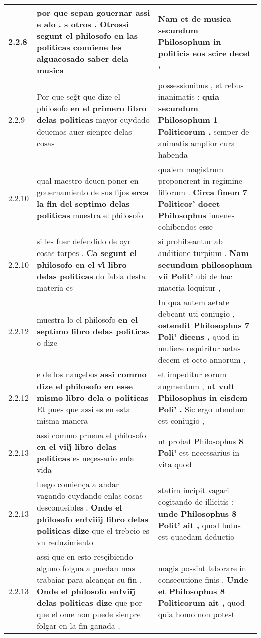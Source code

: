 \begin{tabular}{|p{1cm}|p{6.5cm}|p{6.5cm}|}
2.2.8 & por que sepan gouernar assi e alo . s otros . \textbf{ Otrossi segunt el philosofo en las politicas conuiene les } alguacosado saber dela musica & Nam et de musica \textbf{ secundum Philosophum in politicis } eos scire decet , \\\hline
2.2.9 & Por que seg̃t que dize el philosofo \textbf{ en el primero libro delas politicas } mayor cuydado deuemos auer sienpre delas cosas & possessionibus , et rebus inanimatis : \textbf{ quia secundum Philosophum 1 Politicorum , } semper de animatis amplior cura habenda \\\hline
2.2.10 & qual maestro deuen poner en gouernamiento de sus fijos \textbf{ erca la fin del septimo delas politicas } muestra el philosofo & qualem magistrum proponerent in regimine filiorum . \textbf{ Circa finem 7 Politicor’ docet Philosophus } iuuenes cohibendos esse \\\hline
2.2.10 & si les fuer defendido de oyr cosas torpes . \textbf{ Ca segunt el philosofo en el vi̊ libro delas politicas } do fabla desta materia es & si prohibeantur ab auditione turpium . \textbf{ Nam secundum philosophum vii Polit’ } ubi de hac materia loquitur , \\\hline
2.2.12 & muestra lo el philosofo \textbf{ en el septimo libro delas politicas } o dize & In qua autem aetate debeant uti coniugio , \textbf{ ostendit Philosophus 7 Poli’ dicens , } quod in muliere requiritur aetas decem et octo annorum , \\\hline
2.2.12 & e de los nançebos \textbf{ assi commo dize el philosofo en esse mismo libro dela o politicas } Et pues que assi es en esta misma manera & et impeditur eorum augmentum , \textbf{ ut vult Philosophus in eisdem Poli’ . } Sic ergo utendum est coniugio , \\\hline
2.2.13 & assi commo prueua el philosofo \textbf{ en el viij̊ libro delas politicas } es neçessario enla vida & ut probat Philosophus \textbf{ 8 Poli’ } est necessarius in vita quod \\\hline
2.2.13 & luego comiença a andar vagando cuydando enlas cosas desconueibles . \textbf{ Onde el philosofo enłviiij libro delas politicas dize } que el trebeio es vn reduzimiento & statim incipit vagari cogitando de illicitis : \textbf{ unde Philosophus 8 Polit’ ait , } quod ludus est quaedam deductio \\\hline
2.2.13 & assi que en esto resçibiendo alguno folgua a puedan mas trabaiar para alcançar su fin . \textbf{ Onde el philosofo enłviij̊ delas politicas dize } que por que el ome non puede sienpre folgar en la fin ganada . & magis possint laborare in consecutione finis . \textbf{ Unde et Philosophus 8 Politicorum ait , } quod quia homo non potest \\\hline

\end{tabular}
